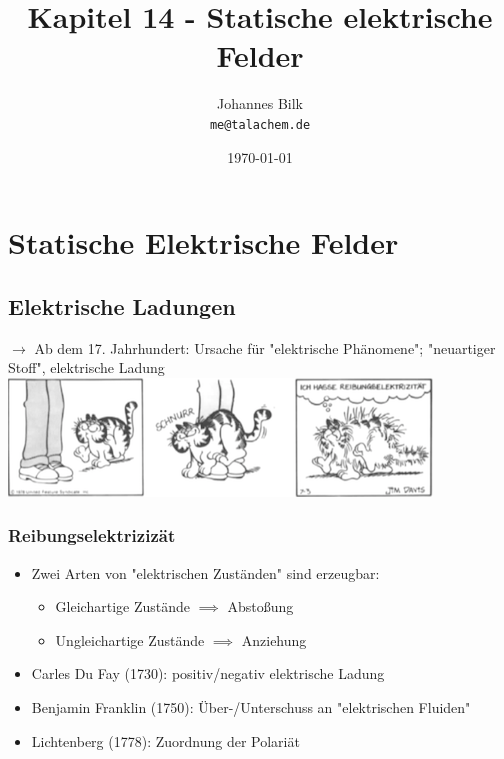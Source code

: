 \documentclass[11pt]{article}
\begin{document}
	\title{Kapitel 14 - Statische elektrische Felder}
		\author
		{Johannes Bilk
			\\
			{\small 	\texttt{me@talachem.de}}
		}
		\date{\today}
	\maketitle
	\tableofcontents
	\setcounter{section}{13} %
	
	\newpage
	
\section{Statische Elektrische Felder}	
	\subsection{ Elektrische Ladungen }	
	
	$\rightarrow$ Ab dem 17. Jahrhundert: Ursache für "elektrische Ph\"{a}nomene"; "neuartiger Stoff", elektrische Ladung\\
\includegraphics{skizzen/14/14_1B0}
		\subsubsection{ Reibungselektriziz\"{a}t }
		
			\begin{itemize}
			\item Zwei Arten von "elektrischen Zust\"{a}nden" sind erzeugbar:
				\begin{itemize}
				\item Gleichartige Zust\"{a}nde $\implies$ Absto\ss{}ung
				\item Ungleichartige Zust\"{a}nde $\implies$ Anziehung
			\end{itemize}
			\item Carles Du Fay (1730): positiv/negativ elektrische Ladung
			\item Benjamin Franklin (1750): Über-/Unterschuss an "elektrischen Fluiden"
			\item Lichtenberg (1778): Zuordnung der Polari\"{a}t
			\end{itemize}
			
\end{document}
